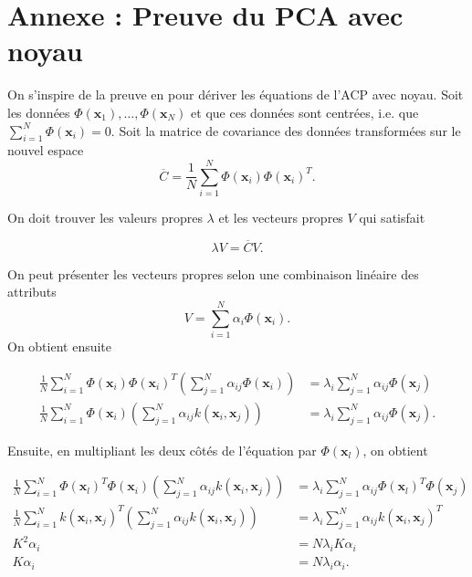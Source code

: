 \section{Annexe : Preuve du PCA avec noyau}

On s'inspire de la preuve en \cite{scholkopf1997kernel} pour dériver les équations de l'ACP avec noyau. Soit les données $\Phi(\textbf{x}_1), \dots, \Phi(\textbf{x}_N)$ et que ces données sont centrées, i.e. que $\sum_{i = 1}^{N}\Phi(\textbf{x}_i) = 0.$ Soit la matrice de covariance des données transformées sur le nouvel espace 
\begin{equation}\label{eq:covphi}
\overline{C} = \frac{1}{N} \sum_{i = 1}^{N} \Phi(\textbf{x}_i)\Phi(\textbf{x}_i)^T.
\end{equation}

On doit trouver les valeurs propres $\lambda$ et les vecteurs propres $V$ qui satisfait 

\begin{equation*}
\lambda V = \overline{C} V. 
\end{equation*}

On peut présenter les vecteurs propres selon une combinaison linéaire des attributs
$$V = \sum_{i = 1}^N\alpha_i \Phi(\textbf{x}_i).$$ On obtient ensuite 


\begin{align*}
\frac{1}{N} \sum_{i = 1}^{N} \Phi(\textbf{x}_i)\Phi(\textbf{x}_i)^T \left(\sum_{j = 1}^{N}\alpha_{ij}\Phi(\textbf{x}_i)\right) &= \lambda_i \sum_{j = 1}^N \alpha_{ij}\Phi(\textbf{x}_j)\\
\frac{1}{N} \sum_{i = 1}^{N} \Phi(\textbf{x}_i) \left(\sum_{j = 1}^{N}\alpha_{ij}k(\textbf{x}_i, \textbf{x}_j)\right) &= \lambda_i \sum_{j = 1}^N \alpha_{ij}\Phi(\textbf{x}_j).
\end{align*}

Ensuite, en multipliant les deux côtés de l'équation par $\Phi(\textbf{x}_l)$, on obtient

\begin{align*}
\frac{1}{N} \sum_{i = 1}^{N} \Phi(\textbf{x}_l)^T\Phi(\textbf{x}_i) \left(\sum_{j = 1}^{N}\alpha_{ij}k(\textbf{x}_i, \textbf{x}_j)\right) &= \lambda_i \sum_{j = 1}^N \alpha_{ij}\Phi(\textbf{x}_l)^T\Phi(\textbf{x}_j)\\
\frac{1}{N} \sum_{i = 1}^{N} k(\textbf{x}_i, \textbf{x}_j)^T \left(\sum_{j = 1}^{N}\alpha_{ij}k(\textbf{x}_i, \textbf{x}_j)\right) &= \lambda_i \sum_{j = 1}^N \alpha_{ij}k(\textbf{x}_i, \textbf{x}_j)^T\\
 K^2 \alpha_{i} &= N \lambda_iK\alpha_{i}\\
  K \alpha_{i} &= N \lambda_i\alpha_{i}.
\end{align*}

